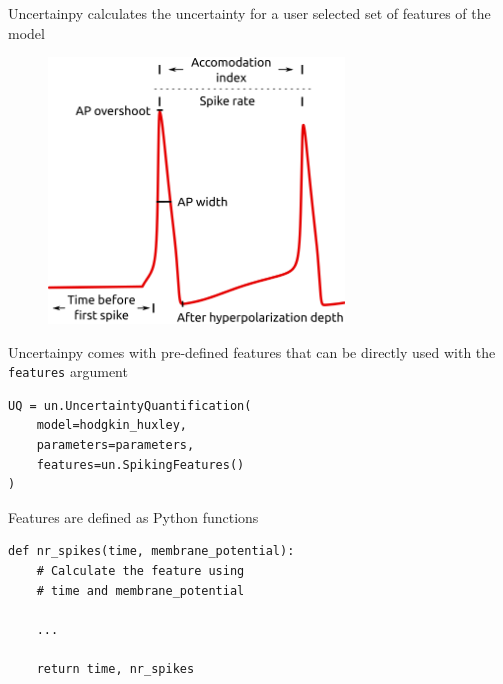 \documentclass[presentation]{beamer}
\begin{document}

\begin{frame}{Uncertainpy calculates the uncertainty for a user selected set of
              features of the model}
  \vspace{-5mm}
  \begin{figure}
      \includegraphics[width=0.7\textwidth]{features.png}
  \end{figure}
  \end{frame}





\begin{frame}[fragile]{Uncertainpy comes with pre-defined features that can be
  directly used with the \lstinline|features| argument}

  \begin{lstlisting}
UQ = un.UncertaintyQuantification(
    model=hodgkin_huxley,
    parameters=parameters,
    features=un.SpikingFeatures()
)
  \end{lstlisting}


\end{frame}




\begin{frame}[fragile]{Features are defined as Python functions}

  \begin{lstlisting}
def nr_spikes(time, membrane_potential):
    # Calculate the feature using
    # time and membrane_potential

    ...

    return time, nr_spikes
  \end{lstlisting}

\end{frame}
\end{document}
